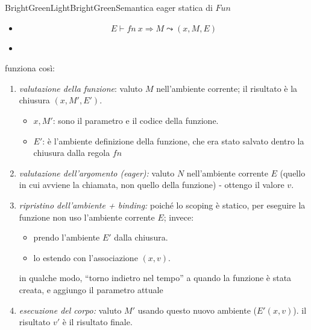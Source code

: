 \documentclass[a4paper,11pt]{report}
\begin{document}
\begin{cdefframe}{BrightGreenLight}{BrightGreen}{Semantica eager statica di \( Fun \)}{}
\begin{itemize}
    \item {}
    \[  E \vdash fn \ x \Rightarrow M \leadsto (x, M, E)\]

\item {}
\begin{prooftree}
\end{prooftree}
\end{itemize}

funziona così:
\begin{enumerate}
    \item \textit{valutazione della funzione}:
    valuto \( M \) nell'ambiente corrente; il risultato è la chiusura \((x, M', E')\).
    \begin{itemize}
        \item \( x, M' \): sono il parametro e il codice della funzione.
        \item \textbf{\( E' \)}: è l'ambiente definizione della funzione, che era stato salvato dentro la chiusura dalla regola \( fn \)
    \end{itemize}

\item \textit{valutazione dell'argomento (eager):}
    valuto \( N \) nell'ambiente corrente \( E \) (quello in cui avviene la chiamata, non quello della funzione) - ottengo il valore \( v \).

    \item \textit{ripristino dell'ambiente + binding:}
    poiché lo scoping è statico, per eseguire la funzione non uso l'ambiente corrente \( E \); invece:
    \begin{itemize}
        \item prendo l'ambiente \( E' \) dalla chiusura.
        \item lo estendo con l'associazione \( (x, v) \).
    \end{itemize}
    {\color{gray}in qualche modo, ``torno indietro nel tempo'' a quando la funzione è stata creata, e aggiungo il parametro attuale}

    \item \textit{esecuzione del corpo:}
    valuto \( M' \) usando questo nuovo ambiente (\( E' (x,v) \)). il risultato \( v' \) è il risultato finale.
\end{enumerate}

\end{cdefframe}
\end{document}
